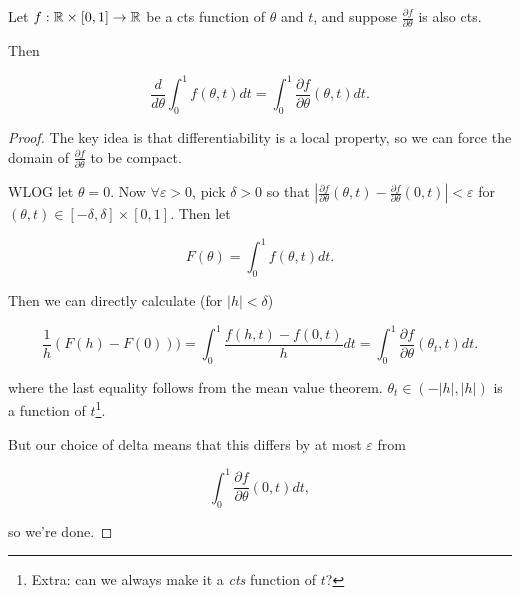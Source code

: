 \documentclass[11pt]{scrartcl}
\begin{document}
\begin{theorem}
    Let $f:\mathbb R \times [0, 1] \rightarrow \mathbb R$  be a cts function of $\theta$ and $t$, and suppose $\frac{\partial f}{\partial \theta}$ is also cts.

    Then 

    \begin{equation}
        \frac{d}{d\theta} \int_0^1 f(\theta, t) dt = \int_0^1 \frac{\partial f}{\partial \theta}(\theta, t) dt.
    \end{equation}

\begin{proof}
    The key idea is that differentiability is a local property, so we can force the domain of $\frac{\partial f}{\partial \theta}$ to be compact.

    WLOG let $\theta = 0$. Now $\forall \varepsilon > 0$, pick $\delta > 0$ so that $\left| \frac{\partial f}{\partial \theta}(\theta, t) -  \frac{\partial f}{\partial \theta} (0, t) \right| < \varepsilon$ for $(\theta, t) \in [-\delta,\delta] \times [0,1]$. Then let

    \begin{equation}
        F(\theta) = \int_0^1 f(\theta, t) dt.
    \end{equation}

    Then we can directly calculate (for $|h| < \delta$)

    \begin{equation}
        \frac1h (F(h) - F(0))) = \int_0^1 \frac{f(h, t) - f(0, t)}{h} dt = \int_0^1 \frac{\partial f}{\partial \theta}(\theta_t, t) dt.
    \end{equation}

    where the last equality follows from the mean value theorem. $\theta_t \in (-|h|, |h|)$ is a function of $t$\footnote{Extra: can we always make it a \emph{cts} function of $t$?}. %

    But our choice of delta means that this differs by at most $\varepsilon$ from

    \begin{equation}
        \int_0^1 \frac{\partial f}{\partial \theta}(0, t) dt,
    \end{equation}

    so we're done.


\end{proof}
\label{switcheroo}
\end{theorem}
\end{document}

